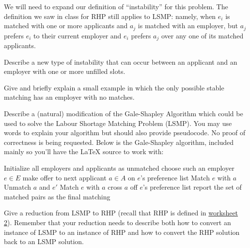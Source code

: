 \begin{questions}
	
	\question[1] We will need to expand our definition of ``instability'' for this problem. The definition we saw in class for RHP still applies to LSMP: namely, when $e_i$ is matched with one or more applicants and $a_j$ is matched with an employer, but $a_j$ prefers $e_i$ to their current employer and $e_i$ prefers $a_j$ over any one of its matched applicants.
	
	Describe a new type of instability that can occur between an applicant and an employer with one or more unfilled slots.
	
	\ifsolutions\fi
	
	\question[1] Give and briefly explain a small example in which the only possible stable matching has an employer with no matches.
	\ifsolutions\fi

      \question[2] Describe a (natural) modification of the Gale-Shapley Algorithm which could be  used to solve the Labour Shortage Matching Problem (LSMP). You may use words to explain your algorithm but should also provide pseudocode. No proof of correctness is being requested. Below is the Gale-Shapley algorithm, included mainly so you'll have the LaTeX source to work with:


    \begin{algorithmic}[1]
	   \State Initialize all employers and applicants as unmatched
	   \State choose such an employer $e \in E$
	   \State make offer to next applicant $a \in A$ on $e$'s preference list
	   \State Match $e$ with $a$ 
	   \State Unmatch $a$ and $e'$ 
	   \State Match $e$ with $a$ 
	   \EndIf
	   \State cross $a$ off $e$'s preference list
	   \EndWhile
	   \State report the set of matched pairs as the final matching
	   \EndProcedure
    \end{algorithmic}

      \ifsolutions\fi

    \question[3] Give a reduction from LSMP to RHP (recall that RHP is defined in \href{https://canvas.ubc.ca/courses/141582/files/32908753?module_item_id=6761017}{worksheet 2}). Remember that your reduction needs to describe both how to convert an instance of LSMP to an instance of RHP and how to convert the RHP solution back to an LSMP solution.
	\ifsolutions\fi
	

\end{questions}
